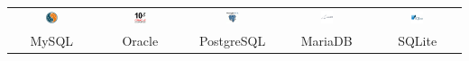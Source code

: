 \documentclass[svgnames,11pt]{beamer}
\begin{document}
\begin{frame}
    \frametitle{}

    \begin{center}
        \begin{tabular}{ccccc}
            \includegraphics[width=0.15\textwidth]{ressources/mysql.png}  &
            \includegraphics[width=0.15\textwidth]{ressources/oracle.png} &
            \includegraphics[width=0.15\textwidth]{ressources/postgresql.png}
                                                                          &
            \includegraphics[width=0.15\textwidth]{ressources/maria.png}
                                                                          &
            \includegraphics[width=0.15\textwidth]{ressources/sqlite.png}   \\
            MySQL                                                         &
            Oracle                                                        &
            PostgreSQL                                                    &
            MariaDB                                                       &
            SQLite
        \end{tabular}
    \end{center}

\end{frame}
\end{document}

